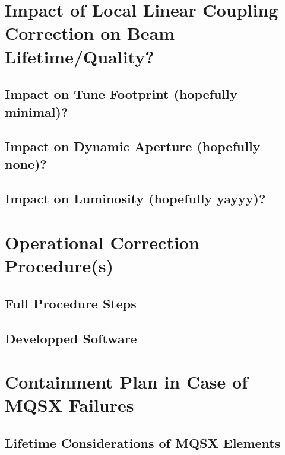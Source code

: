 
\section{Impact of Local Linear Coupling Correction on Beam Lifetime/Quality?}

\subsection{Impact on Tune Footprint (hopefully minimal)?}

\subsection{Impact on Dynamic Aperture (hopefully none)?}

\subsection{Impact on Luminosity (hopefully yayyy)?}


\section{Operational Correction Procedure(s)}

\subsection{Full Procedure Steps}

\subsection{Developped Software}


\section{Containment Plan in Case of MQSX Failures}

\subsection{Lifetime Considerations of MQSX Elements}

